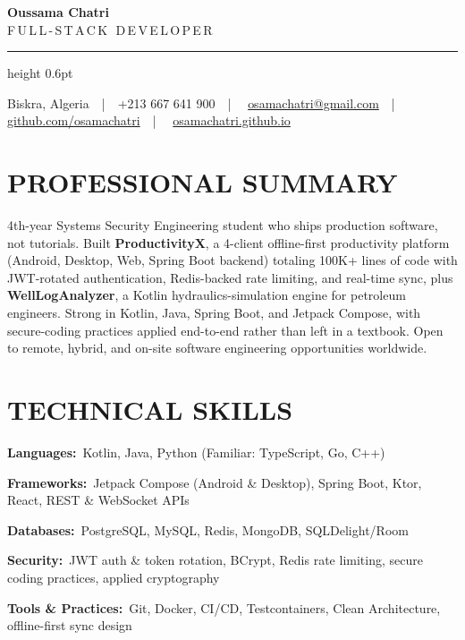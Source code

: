 \documentclass[10.5pt,letterpaper]{article}
\newcommand{\rsection}[1]{\section*{\MakeUppercase{\hspace{0pt}#1}}}
\newcommand{\skillrow}[2]{%
  {\bfseries\small\color{ink}#1:}~{\small\color{body}#2}\par\vspace{3pt}
}
\begin{document}
\begin{center}
  {\condfont\bfseries\fontsize{30}{30}\selectfont\color{ink}Oussama Chatri}\\[3pt]
  {\condfont\color{accent}\fontsize{11}{11}\selectfont\MakeUppercase{F\,u\,l\,l\,-\,S\,t\,a\,c\,k\ \,D\,e\,v\,e\,l\,o\,p\,e\,r}}
\end{center}
\vspace{3pt}
{\color{rule}\hrule height 0.6pt}
\vspace{3pt}
\begin{center}
{\small\color{body}
Biskra, Algeria~~\textcolor{rule}{|}~~+213 667 641 900~~\textcolor{rule}{|}~~%
\href{mailto:osamachatri@gmail.com}{osamachatri@gmail.com}~~\textcolor{rule}{|}~~%
\href{https://github.com/osamachatri}{github.com/osamachatri}~~\textcolor{rule}{|}~~%
\href{https://osamachatri.github.io}{osamachatri.github.io}}
\end{center}
\vspace{-4pt}

\rsection{Professional Summary}
{\small\color{body}
4th-year Systems Security Engineering student who ships production software, not tutorials. Built \textbf{ProductivityX}, a 4-client offline-first productivity platform (Android, Desktop, Web, Spring Boot backend) totaling 100K+ lines of code with JWT-rotated authentication, Redis-backed rate limiting, and real-time sync, plus \textbf{WellLogAnalyzer}, a Kotlin hydraulics-simulation engine for petroleum engineers. Strong in Kotlin, Java, Spring Boot, and Jetpack Compose, with secure-coding practices applied end-to-end rather than left in a textbook. Open to remote, hybrid, and on-site software engineering opportunities worldwide.
}

\rsection{Technical Skills}
\skillrow{Languages}{Kotlin, Java, Python \textcolor{muted}{(Familiar: TypeScript, Go, C++)}}
\skillrow{Frameworks}{Jetpack Compose (Android \& Desktop), Spring Boot, Ktor, React, REST \& WebSocket APIs}
\skillrow{Databases}{PostgreSQL, MySQL, Redis, MongoDB, SQLDelight/Room}
\skillrow{Security}{JWT auth \& token rotation, BCrypt, Redis rate limiting, secure coding practices, applied cryptography}
\skillrow{Tools \& Practices}{Git, Docker, CI/CD, Testcontainers, Clean Architecture, offline-first sync design}
\end{document}
